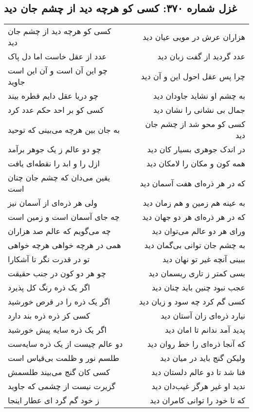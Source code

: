 \begin{center}
\section*{غزل شماره ۳۷۰: کسی کو هرچه دید از چشم جان دید}
\label{sec:370}
\begin{longtable}{l p{0.5cm} r}
کسی کو هرچه دید از چشم جان دید
&&
هزاران عرش در مویی عیان دید
\\
عدد از عقل خاست اما دل پاک
&&
عدد گردید از گفت زبان دید
\\
چو این آن است و آن این است جاوید
&&
چرا پس عقل احول این و آن دید
\\
چو دریا عقل دایم قطره بیند
&&
به چشم او نشاید جاودان دید
\\
کسی کو بر احد حکم عدد کرد
&&
جمال بی نشانی را نشان دید
\\
به جان بین هرچه می‌بینی که توحید
&&
کسی کو محو شد از چشم جان دید
\\
چو دو عالم ز یک جوهر برآمد
&&
در اندک جوهری بسیار کان دید
\\
ازل را و ابد را نقطه‌ای یافت
&&
همه کون و مکان را لامکان دید
\\
یقین می‌دان که چشم جان چنان است
&&
که در هر ذره‌ای هفت آسمان دید
\\
ولی هر ذره‌ای از آسمان نیز
&&
به عینه هم زمین و هم زمان دید
\\
چه جای آسمان است و زمین است
&&
که در هر ذره‌ای هر دو جهان دید
\\
چه می‌گویم که عالم صد هزاران
&&
ورای هر دو عالم می‌توان دید
\\
همی در هرچه خواهی هرچه خواهی
&&
به چشم جان توانی بی‌گمان دید
\\
تو در قدرت نگر تا آشکارا
&&
ببینی آنچه غیر تو نهان دید
\\
چو هر دو کون در جنب حقیقت
&&
بسی کمتر ز تاری ریسمان دید
\\
اگر یک ذره رنگ کل پذیرد
&&
عجب نبود چنین باید چنان دید
\\
اگر یک ذره را در قرص خورشید
&&
کسی گم کرد چه سود و زیان دید
\\
کسی کز ذره ذره بند دارد
&&
نیارد ذره‌ای زان آستان دید
\\
اگر یک ذره سایه پیش خورشید
&&
پدید آمد ندانم تا امان دید
\\
دو عالم چیست از یک ذره سایه‌ست
&&
که آنجا ذره‌ای را خط روان دید
\\
طلسم نور و ظلمت بی‌قیاس است
&&
ولیکن گنج باید در میان دید
\\
کسی کان گنج می‌بیند طلسمش
&&
فنا شد تا دو عالم دلستان دید
\\
گزیرت نیست از چشمی که جاوید
&&
ندید او غیر هرگز غیب‌دان دید
\\
ز خود گم گرد ای عطار اینجا
&&
که تا خود را توانی کامران دید
\\
\end{longtable}
\end{center}
